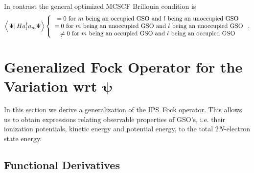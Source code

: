 \documentclass[aps,preprint]{revtex4}%
\begin{document}
In contrast the general optimized MCSCF Brillouin condition is
\begin{equation}
\left\langle \left.  \Psi\right\vert Ha_{l}^{\dagger}a_{m}\Psi\right\rangle
\left\{
\begin{array}
[c]{c}%
=0\text{ for }m\text{ being an occupied GSO and }l\text{ being an unoccupied
GSO }\\
=0\text{ for }m\text{ being an unoccupied GSO and }l\text{ being an unoccupied
GSO}\\
\neq0\text{ for }m\text{ being an occupied GSO and }l\text{ being an occupied
GSO }%
\end{array}
\right.  .
\end{equation}


\section{Generalized Fock Operator \label{Fock} for the Variation wrt
$\mathbf{\psi}$}

In this section we derive a generalization of the IPS\ Fock operator. This
allows us to obtain expressions relating observable properties of GSO's, i.e.
their ionization potentials, kinetic energy and potential energy, to the total
$2N$-electron state energy.

\subsection{Functional Derivatives\label{FD}}
\end{document}
